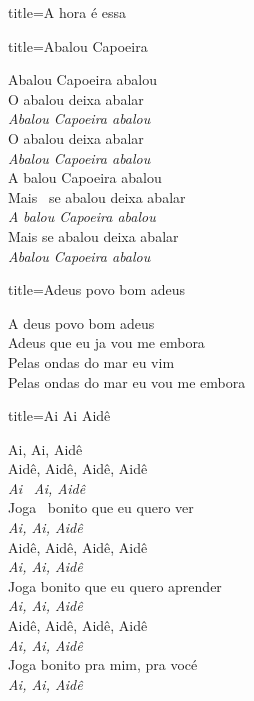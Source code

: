 \documentclass[fontsize=14pt, twoside]{scrreprt}
\begin{document}
\begin{multicols*}{2}
\begin{song}{title={A hora é essa}}

\end{song}

\begin{song}{title={Abalou Capoeira}}
\begin{verse*}
Abalou Capoeira abalou\\
O abalou deixa abalar\\
\textit{Abalou Capoeira abalou}\\
O abalou deixa abalar\\
\textit{Abalou Capoeira abalou}\\

A balou Capoeira abalou\\
Mais \ se abalou deixa abalar\\
\textit{A} \textit{balou Capoeira abalou}\\
Mais se abalou deixa abalar\\
\textit{Abalou Capoeira abalou}\\

\end{verse*}
\end{song}
\begin{song}
    
\end{song}
\begin{song}{title={Adeus povo bom adeus}}
    \begin{verse*}
         A deus povo bom adeus\\
        Adeus que eu ja vou me embora\\
        Pelas ondas do mar eu vim\\
        Pelas ondas do mar eu vou me embora\\
    \end{verse*}
        \end{song}
\pagebreak
\begin{song}{title={Ai Ai Aidê}}
    \begin{verse*}
     Ai, Ai, Aidê\\
    Aidê, Aidê, Aidê, Aidê\\
    \textit{Ai}  \ \textit{Ai, Aidê}\\
    Joga \ bonito que eu quero ver\\
    \textit{Ai, Ai, Aidê}\\
    Aidê, Aidê, Aidê, Aidê\\
    \textit{Ai, Ai, Aidê}\\
    Joga bonito que eu quero aprender\\
    \textit{Ai, Ai, Aidê}\\
    Aidê, Aidê, Aidê, Aidê\\
    \textit{Ai, Ai, Aidê}\\
    Joga bonito pra mim, pra vocé\\
    \textit{Ai, Ai, Aidê}\\
    \end{verse*}
    \end{song}


\end{multicols*}
\end{document}
